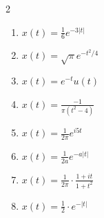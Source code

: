 \begin{solution}
    \text{ }
    \begin{multicols}{2}
    \begin{enumerate}[label=(\alph*)]
        \item $x(t) = \frac{1}{6} e^{-3|t|}$
        \item $x(t) = \sqrt{\pi} e^{-t^2 / 4}$
        \item $x(t) = e^{-t} u(t)$
        \item $x(t) = \frac{-1}{\pi (t^2 - 4)}$
        \item $x(t) = \frac{1}{2\pi} e^{i5t}$
        \item $x(t) = \frac{1}{2a} e^{-a|t|}$
        \item $x(t) = \frac{1}{2\pi} \cdot \frac{1 + it}{1 + t^2}$
        \item $x(t) = \frac{1}{2} \cdot e^{-|t|}$
    \end{enumerate}
    \end{multicols}
\end{solution}

